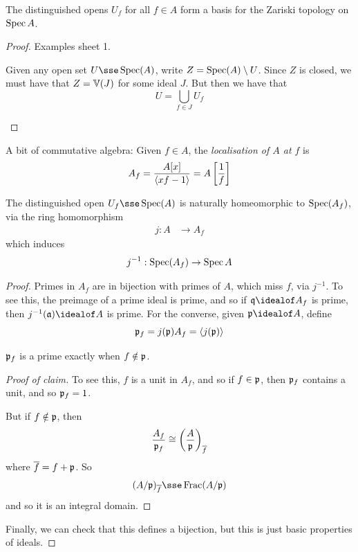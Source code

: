\documentclass{article}
\begin{document}
\begin{lemma}
    The distinguished opens \(U_f\) for all \(f \in A\) form a basis for the Zariski topology on \(\operatorname{Spec} A\).
\end{lemma}

\begin{proof}
    Examples sheet 1. \begin{addendum}
        Given any open set \(U \sse \Spec(A)\), write \(Z = \operatorname{Spec}(A) \setminus U\). Since \(Z\) is closed, we must have that \(Z = \mathbb{V}(J)\) for some ideal \(J\). But then we have that
        \[U = \bigcup_{f \in J}U_f\]
    \end{addendum}
\end{proof}

A bit of commutative algebra: Given \(f \in A\), the \emph{localisation of \(A\) at \(f\)} is
\[A_f = \frac{A[x]}{\left\langle xf - 1 \right\rangle} = A\left[\frac{1}{f}\right]\]

\begin{lemma}
    The distinguished open \(U_f \sse \Spec(A)\) is naturally homeomorphic to \(\operatorname{Spec}(A_f)\), via the ring homomorphism
    \begin{align*}
        j : A &\to A_f
    \end{align*}
    which induces
    \[j^{-1} : \operatorname{Spec}(A_f) \to \operatorname{Spec} A\]
\end{lemma}

\lec

\begin{proof}
    Primes in \(A_f\) are in bijection with primes of \(A\), which miss \(f\), via \(j^{-1}\). To see this, the preimage of a prime ideal is prime, and so if \(\mfq \idealof A_f\) is prime, then \(j^{-1}(\mfa) \idealof A\) is prime. For the converse, given \(\mfp \idealof A\), define
    \[\mathfrak{p}_f = j(\mathfrak{p})A_f = \left\langle j(\mathfrak{p}) \right\rangle\]
    
    \begin{claim}
        \(\mathfrak{p}_f\) is a prime exactly when \(f \notin \mathfrak{p}\). 
    \end{claim}
    \begin{proof}
        [Proof of claim]
        To see this, \(f\) is a unit in \(A_f\), and so if \(f \in \mathfrak{p}\), then \(\mathfrak{p}_f\) contains a unit, and so \(\mathfrak{p}_f = 1\).
    
        But if \(f \notin \mathfrak{p}\), then
        \[\frac{A_f}{\mathfrak{p}_f} \cong \left(\frac{A}{\mathfrak{p}}\right)_{\overline f}\]
        where \(\overline f = f + \mathfrak{p}\). So
        \[(A/\mfp)_{\overline f} \sse \Frac(A/\mfp)\]
        and so it is an integral domain.
    \end{proof}

    Finally, we can check that this defines a bijection, but this is just basic properties of ideals.
\end{proof}
\end{document}
